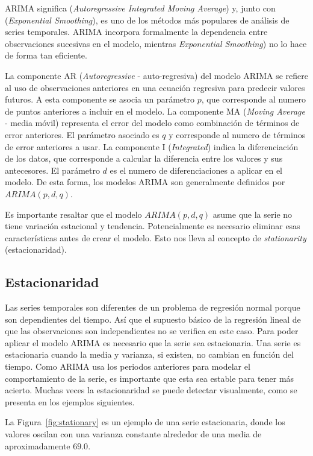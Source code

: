 \documentclass[11pt,spanish,listoffigures,listoftables]{tfgetsinf}
\begin{document}
    ARIMA significa ({\em Autoregressive Integrated Moving Average}) y, junto con ({\em Exponential Smoothing}), es uno de los métodos más populares de análisis de series temporales. ARIMA incorpora formalmente la dependencia entre observaciones sucesivas en el modelo, mientras {\em Exponential Smoothing}) no lo hace de forma tan eficiente.
    
    La componente AR ({\em Autoregressive} - auto-regresiva) del modelo ARIMA se refiere al uso de observaciones anteriores en una ecuación regresiva para predecir valores futuros. A esta componente se asocia un parámetro \(p\), que corresponde al numero de puntos anteriores a incluir en el modelo. La componente MA ({\em Moving Average} - media móvil) representa el error del modelo como combinación de términos de error anteriores. El parámetro asociado es \(q\) y corresponde al numero de términos de error anteriores a usar. La componente I ({\em Integrated}) indica la diferenciación de los datos, que corresponde a calcular la diferencia entre los valores y sus antecesores. El parámetro \(d\) es el numero de diferenciaciones a aplicar en el modelo. De esta forma, los modelos ARIMA son generalmente definidos por \(ARIMA(p, d, q)\).
    
    Es importante resaltar que el modelo \(ARIMA(p, d, q)\) asume que la serie no tiene variación estacional y tendencia. Potencialmente es necesario eliminar esas características antes de crear el modelo. Esto nos lleva al concepto de {\em stationarity} (estacionaridad).
    
    \subsection{Estacionaridad}
    Las series temporales son diferentes de un problema de regresión normal porque son dependientes del tiempo. Así que el supuesto básico de la regresión lineal de que las observaciones son independientes no se verifica en este caso. Para poder aplicar el modelo ARIMA es necesario que la serie sea estacionaria. Una serie es estacionaria cuando la media y varianza, si existen, no cambian en función del tiempo. Como ARIMA usa los periodos anteriores para modelar el comportamiento de la serie, es importante que esta sea estable para tener más acierto. Muchas veces la estacionaridad se puede detectar visualmente, como se presenta en los ejemplos siguientes.
    
    La Figura~\ref{fig:stationary} es un ejemplo de una serie estacionaria, donde los valores oscilan con una varianza constante alrededor de una media de aproximadamente \(69.0\). 
    
\end{document}
